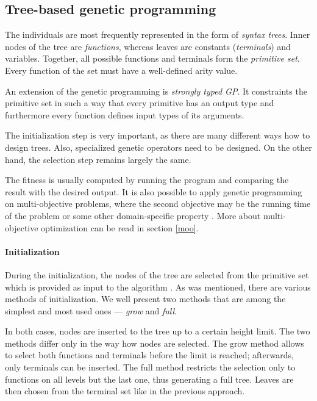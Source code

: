 \subsection{Tree-based genetic programming} \label{gp:treebased}
The individuals are most frequently represented in the form of 
\emph{syntax trees}. Inner nodes of the tree are \emph{functions}, whereas 
leaves  are constants (\emph{terminals}) and variables. Together, all possible
functions and terminals form the \emph{primitive set}. Every function of the
set must have a well-defined arity value.

An extension of the genetic programming is \emph{strongly typed GP}. It
constraints the primitive set in such a way that every primitive has an output
type and furthermore every function defines input types of its arguments.

The initialization step is very important, as
there are many different ways how to design trees. Also, specialized genetic
operators need to be designed. On the other hand, the selection step remains
largely the same. \cite{Poli:2008:FGG:1796422}
 
The fitness is usually computed by running the program and comparing the result 
with the desired output. It is also possible to apply genetic programming on
multi-objective problems, where the second objective may be the running time
of the problem or some other domain-specific property
\citep{Poli:2008:FGG:1796422}. More about multi-objective optimization can be
read in section \ref{moo}.

\paragraph{Initialization}
During the initialization, the nodes of the tree are selected from the
primitive set which is provided as input to the algorithm
\citep{Koza:1992:GPP:138936}. As was mentioned, there are various methods of 
initialization. We well present two methods that are among the simplest and 
most used ones --- \emph{grow} and \emph{full}.

In both cases, nodes are inserted to the tree up to a certain height limit.
The two methods differ only in the way how nodes are selected. The grow method
allows to select both functions and terminals before the limit is reached;
afterwards, only terminals can be inserted. The full method restricts the
selection only to functions on all levels but the last one, thus generating 
a full tree. Leaves are then
chosen from the terminal set like in the previous approach.

